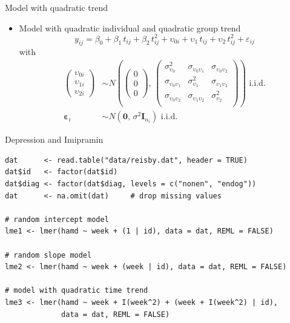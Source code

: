 \documentclass[aspectratio=169]{beamer}
\newcommand{\vect}[1]{\mathbf{#1}}
\newcommand{\mat}[1]{\mathbf{#1}}
\newcommand{\gvect}[1]{\boldsymbol{#1}}
\begin{document}
\begin{frame}[fragile]{Model with quadratic trend}
  \begin{itemize}
    \item Model with quadratic individual and quadratic group trend
      \[
 y_{ij} = \beta_0 + \beta_1\,t_{ij} + \beta_2\,t^2_{ij} + \upsilon_{0i} +
      \upsilon_1\,t_{ij} + \upsilon_2\,t^2_{ij} + \varepsilon_{ij}
      \]
with
\begin{align*}
  \begin{pmatrix}
    \upsilon_{0i}\\
    \upsilon_{1i}\\
    \upsilon_{2i}
  \end{pmatrix} &\sim
  N \left(\begin{pmatrix}
      0\\ 0\\ 0
  \end{pmatrix}, \,
  \begin{pmatrix}
    \sigma^2_{\upsilon_0} & \sigma_{\upsilon_0 \upsilon_1} & \sigma_{\upsilon_0 \upsilon_2}\\
    \sigma_{\upsilon_0 \upsilon_1} & \sigma^2_{\upsilon_1} & \sigma_{\upsilon_1 \upsilon_2}\\
    \sigma_{\upsilon_0 \upsilon_2} & \sigma_{\upsilon_1 \upsilon_2} & \sigma^2_{\upsilon_2}\\
      \end{pmatrix} \right)
    \text{ i.i.d.} \\
  \gvect{\varepsilon}_i &\sim N(\vect{0}, \, \sigma^2 \mat{I}_{n_i})
    \text{ i.i.d.}
\end{align*}
  \end{itemize}
\vspace{-.5cm}
\end{frame}

\begin{frame}[fragile]{Depression and Imipramin}
  \begin{lstlisting}
dat      <- read.table("data/reisby.dat", header = TRUE)
dat$id   <- factor(dat$id)
dat$diag <- factor(dat$diag, levels = c("nonen", "endog"))
dat      <- na.omit(dat)     # drop missing values

# random intercept model
lme1 <- lmer(hamd ~ week + (1 | id), data = dat, REML = FALSE)

# random slope model
lme2 <- lmer(hamd ~ week + (week | id), data = dat, REML = FALSE)

# model with quadratic time trend
lme3 <- lmer(hamd ~ week + I(week^2) + (week + I(week^2) | id),
             data = dat, REML = FALSE)
  \end{lstlisting}
\end{frame}
\end{document}

